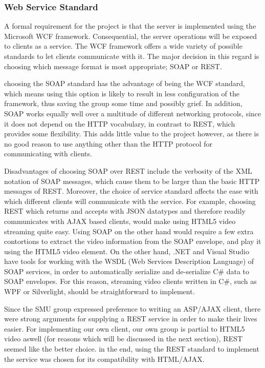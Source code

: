 \subsubsection{Web Service Standard}
A formal requirement for the project is that the server is implemented using the Microsoft WCF framework. Consequential, the server operations will be exposed to clients as a service. The WCF framework offers a wide variety of possible standards to let clients communicate with it. The major decision in this regard is choosing which message format is most appropriate; SOAP or REST.

choosing the SOAP standard has the advantage of being the WCF standard, which means using this option is likely to result in less configuration of the framework, thus saving the group some time and possibly grief. In addition, SOAP works equally well over a multitude of different networking protocols, since it does not depend on the HTTP vocabulary, in contrast to REST, which provides some flexibility. This adds little value to the project however, as there is no good reason to use anything other than the HTTP protocol for communicating with clients.

Disadvantages of choosing SOAP over REST include the verbosity of the XML notation of SOAP messages, which cause them to be larger than the basic HTTP messages of REST. Moreover, the choice of service standard affects the ease with which different clients will communicate with the service. For example, choosing REST which returns and accepts with JSON datatypes and therefore readily communicates with AJAX based clients, would make using  HTML5 video streaming quite easy. Using SOAP on the other hand would require a few extra contortions to extract the video information from the SOAP envelope, and play it using the HTML5 video element. On the other hand, .NET and Visual Studio have tools for working with the WSDL (Web Services Description Language) of SOAP services, in order to automatically serialize and de-serialize C\# data to SOAP envelopes. For this reason, streaming video clients written in C\#, such as WPF or Silverlight, should be straightforward to implement.

Since the SMU group expressed preference to writing an ASP/AJAX client, there were strong arguments for supplying a REST service in order to make their lives easier. For implementing our own client, our own group is partial to HTML5 video aswell (for reasons which will be discussed in the next section), REST seemed like the better choice. in the end, using the REST standard to implement the service was chosen for its compatibility with HTML/AJAX.

